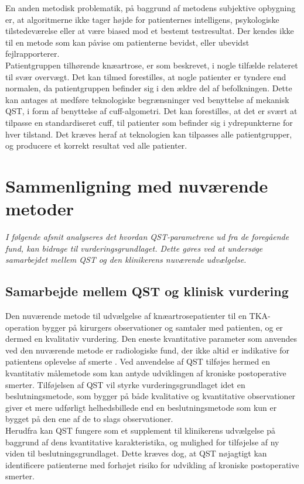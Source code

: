 En anden metodisk problematik, på baggrund af metodens subjektive opbygning er, at algoritmerne ikke tager højde for patienternes intelligens, psykologiske tilstedeværelse eller at være biased mod et bestemt testresultat. Der kendes ikke til en metode som kan påvise om patienterne bevidst, eller ubevidst fejlrapporterer. \citep{Dyck1998}  \\ 
Patientgruppen tilhørende knæartrose, er som beskrevet, i nogle tilfælde relateret til svær overvægt. Det kan tilmed forestilles, at nogle patienter er tyndere end normalen, da patientgruppen befinder sig i den ældre del af befolkningen. Dette kan antages at medføre teknologiske begrænsninger ved benyttelse af mekanisk QST, i form af benyttelse af cuff-algometri. Det kan forestilles, at det er svært at tilpasse en standardiseret cuff, til patienter som befinder sig i ydrepunkterne for hver tilstand. Det kræves heraf at teknologien kan tilpasses alle patientgrupper, og producere et korrekt resultat ved alle patienter. 

\section{Sammenligning med nuværende metoder}
\textit{I følgende afsnit analyseres det hvordan QST-parametrene ud fra de foregående fund, kan bidrage til vurderingsgrundlaget. Dette gøres ved at undersøge samarbejdet mellem QST og den klinikerens nuværende udvælgelse.}

\subsection{Samarbejde mellem QST og klinisk vurdering}
Den nuværende metode til udvælgelse af knæartrosepatienter til en TKA-operation bygger på kirurgers observationer og samtaler med patienten, og er dermed en kvalitativ vurdering. \citep{Troelsen2012} \citep{skou2016} Den eneste kvantitative parameter som anvendes ved den nuværende metode er radiologiske fund, der ikke altid er indikative for patientens oplevelse af smerte \citep{Leary2016}. Ved anvendelse af QST tilføjes hermed en kvantitativ målemetode som kan antyde udviklingen af kroniske postoperative smerter. Tilføjelsen af QST vil styrke vurderingsgrundlaget idet en beslutningsmetode, som bygger på både kvalitative og kvantitative observationer giver et mere udførligt helhedsbillede end en beslutningsmetode som kun er bygget på den ene af de to slags observationer. \citep{Gronmo2012} \\
Herudfra kan QST fungere som et supplement til klinikerens udvælgelse på baggrund af dens kvantitative karakteristika, og mulighed for tilføjelse af ny viden til beslutningsgrundlaget. Dette kræves dog, at QST nøjagtigt kan identificere patienterne med forhøjet risiko for udvikling af kroniske postoperative smerter.   

